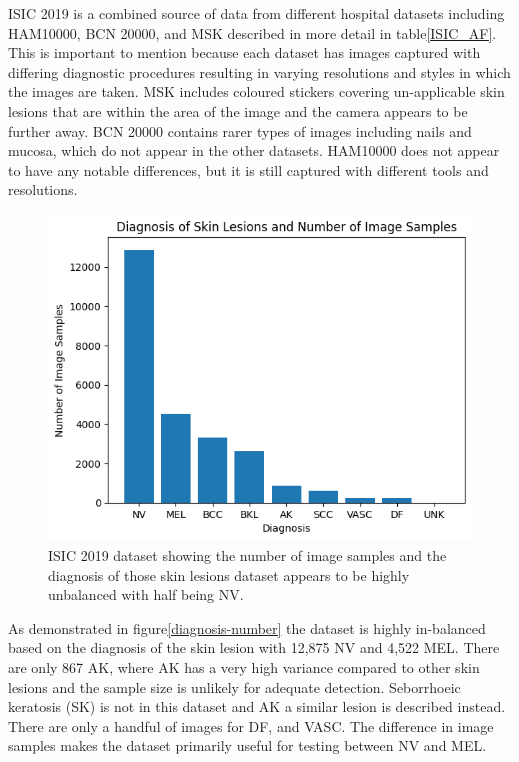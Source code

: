ISIC 2019 is a combined source of data from different hospital datasets including HAM10000, BCN 20000, and MSK described in more detail in table\ref{ISIC_AF}. This is important to mention because each dataset has images captured with differing diagnostic procedures resulting in varying resolutions and styles in which the images are taken. MSK includes coloured stickers covering un-applicable skin lesions that are within the area of the image and the camera appears to be further away. BCN 20000 contains rarer types of images including nails and mucosa, which do not appear in the other datasets. HAM10000 does not appear to have any notable differences, but it is still captured with different tools and resolutions.

\begin{figure}
    \centering
    \includegraphics[scale=0.75]{images/ISIC/diagnosis-number.png}
    \caption{ISIC 2019 dataset showing the number of image samples and the diagnosis of those skin lesions dataset appears to be highly unbalanced with half being NV.} 
\end{figure}\label{diagnosis-number}
    
As demonstrated in figure\ref{diagnosis-number} the dataset is highly in-balanced based on the diagnosis of the skin lesion with 12,875 NV and 4,522 MEL. There are only 867 AK, where AK has a very high variance compared to other skin lesions and the sample size is unlikely for adequate detection. Seborrhoeic keratosis (SK) is not in this dataset and AK a similar lesion is described instead. There are only a handful of images for DF, and VASC. The difference in image samples makes the dataset primarily useful for testing between NV and MEL.

